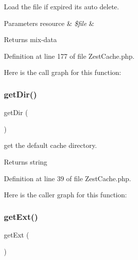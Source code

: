 Load the file if expired its auto delete.


\begin{DoxyParams}[1]{Parameters}
resource & {\em \$file} & \\
\hline
\end{DoxyParams}
\begin{DoxyReturn}{Returns}
mix-\/data 
\end{DoxyReturn}


Definition at line 177 of file Zest\+Cache.\+php.

Here is the call graph for this function\+:
\mbox{\label{class_zest_1_1_cache_1_1_zest_cache_1_1_zest_cache_ab09f9419dbc35f97d48aafccc2416ed1}} 
\subsubsection{\texorpdfstring{get\+Dir()}{getDir()}}
{\footnotesize\ttfamily get\+Dir (\begin{DoxyParamCaption}{ }\end{DoxyParamCaption})}

get the default cache directory.

\begin{DoxyReturn}{Returns}
string 
\end{DoxyReturn}


Definition at line 39 of file Zest\+Cache.\+php.

Here is the caller graph for this function\+:
\mbox{\label{class_zest_1_1_cache_1_1_zest_cache_1_1_zest_cache_a57a607b4d13b0d1ad2367fd868bad64b}} 
\subsubsection{\texorpdfstring{get\+Ext()}{getExt()}}
{\footnotesize\ttfamily get\+Ext (\begin{DoxyParamCaption}{ }\end{DoxyParamCaption})}

